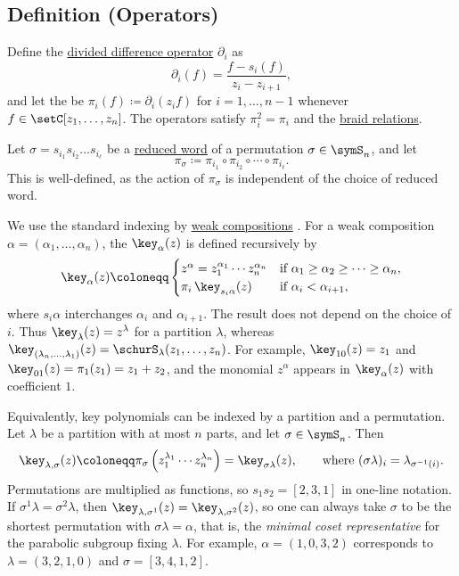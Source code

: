 \subsection[keyDefinitionOperators]{Definition (Operators)}

Define the \hyperref[dividedDifferenceOperators]{divided difference operator}
$\partial_i$ as
\[
 \partial_i(f) = \frac{f - s_i(f)}{z_i - z_{i+1}},
\]
and let the 
\label{isobaricDividedDifferenceOperator} be
$\pi_i(f) \coloneqq \partial_i(z_i f)$ for $i=1,\dotsc,n-1$ whenever
$f \in \setC[z_1,\dotsc,z_n]$.
The operators satisfy $\pi_i^2 = \pi_i$ and the
\hyperref[braidRelations]{braid relations}.

Let $\sigma = s_{i_1} s_{i_2} \dotsc s_{i_\ell}$ be a \hyperref[reducedWord]{reduced word} of a permutation $\sigma \in \symS_n$,
and let
\[
 \pi_\sigma \coloneqq \pi_{i_1} \circ \pi_{i_2} \circ \dotsb \circ \pi_{i_\ell}.
\]
This is well-defined, as the action of $\pi_\sigma$ is independent of the choice of reduced word.


We use the standard indexing by \hyperref[weakCompositions]{weak compositions}
\cite{Lascoux1990Keys,ReinerShimozono1995}.
For a weak composition $\alpha = (\alpha_1,\dotsc,\alpha_n)$, the
\label{keyPolynomialOperatorDefinition} $\key_\alpha(z)$
is defined recursively by
\[
 \key_\alpha(z) \coloneqq
 \begin{cases}
  z^\alpha = z_1^{\alpha_1}\dotsm z_n^{\alpha_n} & \text{if } \alpha_1 \geq \alpha_2 \geq \dotsb \geq \alpha_n, \\
  \pi_i\, \key_{s_i \alpha}(z) & \text{if } \alpha_i < \alpha_{i+1},
 \end{cases}
\]
where $s_i\alpha$ interchanges $\alpha_i$ and $\alpha_{i+1}$.
The result does not depend on the choice of $i$.
Thus $\key_\lambda(z) = z^\lambda$ for a partition $\lambda$,
whereas $\key_{(\lambda_n,\dotsc,\lambda_1)}(z)=\schurS_\lambda(z_1,\dotsc,z_n)$.
For example, $\key_{10}(z) = z_1$ and $\key_{01}(z) = \pi_1(z_1) = z_1+z_2$,
and the monomial $z^\alpha$ appears in $\key_\alpha(z)$ with coefficient $1$.

Equivalently, key polynomials can be indexed by a partition and a permutation.
Let $\lambda$ be a partition with at most $n$ parts, and let $\sigma \in \symS_n$.
Then
\begin{equation*}
 \key_{\lambda,\sigma}(z) \coloneqq \pi_\sigma\left( z_1^{\lambda_1} \dotsm z_n^{\lambda_n} \right)
 = \key_{\sigma\lambda}(z),
 \qquad \text{where } (\sigma\lambda)_i = \lambda_{\sigma^{-1}(i)}.
\end{equation*}
Permutations are multiplied as functions, so $s_1 s_2 = [2,3,1]$ in one-line notation.
If $\sigma^1\lambda=\sigma^2\lambda$, then
$\key_{\lambda,\sigma^1}(z) = \key_{\lambda,\sigma^2}(z)$, so one can always take
$\sigma$ to be the shortest permutation with $\sigma\lambda = \alpha$, that is, the
\emph{minimal coset representative} for the parabolic subgroup fixing $\lambda$.
For example, $\alpha = (1,0,3,2)$ corresponds to $\lambda = (3,2,1,0)$ and
$\sigma = [3, 4, 1, 2]$.

